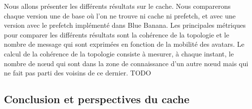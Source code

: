 Nous allons présenter les différents résultats sur le cache. Nous comparerons chaque version une de base où l'on ne trouve ni cache ni prefetch, et avec une version avec le prefetch implémenté dans Blue Banana.
Les principales métriques pour comparer les différents résultats sont la cohérence de la topologie et le nombre de message qui sont exprimées en fonction de la mobilité des avatars. Le calcul de la cohérence de la topologie consiste à mesurer, à chaque instant, le nombre de nœud qui sont dans la zone de connaissance d'un autre nœud mais qui ne fait pas parti des voisins de ce dernier.
TODO




\subsection{Conclusion et perspectives du cache} 



